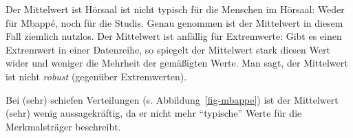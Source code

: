 \documentclass[
  letterpaper,
  twoside,
  open=any]{scrbook}
\theoremstyle{definition}
\theoremstyle{definition}
\theoremstyle{definition}
\theoremstyle{remark}
\begin{document}
Der Mittelwert ist Hörsaal ist nicht typisch für die Menschen im
Hörsaal: Weder für Mbappé, noch für die Studis. Genau genommen ist der
Mittelwert in diesem Fall ziemlich nutzlos. Der Mittelwert ist anfällig
für Extremwerte: Gibt es einen Extremwert in einer Datenreihe, so
spiegelt der Mittelwert stark diesen Wert wider und weniger die Mehrheit
der gemäßigten Werte. Man sagt, der Mittelwert ist nicht \emph{robust}
(gegenüber Extremwerten).

\begin{tcolorbox}[enhanced jigsaw, colframe=quarto-callout-important-color-frame, arc=.35mm, leftrule=.75mm, bottomtitle=1mm, titlerule=0mm, colbacktitle=quarto-callout-important-color!10!white, breakable, bottomrule=.15mm, colback=white, left=2mm, rightrule=.15mm, opacityback=0, toptitle=1mm, toprule=.15mm, opacitybacktitle=0.6, title=\textcolor{quarto-callout-important-color}{\faExclamation}\hspace{0.5em}{Wichtig}, coltitle=black]

Bei (sehr) schiefen Verteilungen (s. Abbildung~\ref{fig-mbappe}) ist der
Mittelwert (sehr) wenig aussagekräftig, da er nicht mehr
\enquote{typische} Werte für die Merkmalsträger beschreibt.

\end{tcolorbox}
\end{document}
